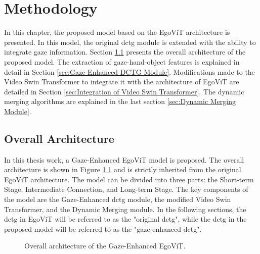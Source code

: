 \chapter{Methodology}
\label{chap:methodology}
In this chapter, the proposed model based on the EgoViT architecture is presented. In this model, the original \gls{dctg} module is extended with the ability to integrate gaze information. Section \ref{sec:Overall Architecture} presents the overall architecture of the proposed model. The extraction of gaze-hand-object features is explained in detail in Section \ref{sec:Gaze-Enhanced DCTG Module}. Modifications made to the Video Swin Transformer \cite{liu_video_2021} to integrate it with the architecture of EgoViT \cite{pan_egovit_2023} are detailed in Section \ref{sec:Integration of Video Swin Transformer}. The dynamic merging algorithms are explained in the last section \ref{sec:Dynamic Merging Module}.

\section{Overall Architecture}
\label{sec:Overall Architecture}
In this thesis work, a Gaze-Enhanced EgoViT model is proposed. The overall architecture is shown in Figure \ref{fig:overall_architecture} and is strictly inherited from the original EgoViT architecture. The model can be divided into three parts: the Short-term Stage, Intermediate Connection, and Long-term Stage. The key components of the model are the Gaze-Enhanced \gls{dctg} module, the modified Video Swin Transformer, and the Dynamic Merging module. In the following sections, the \gls{dctg} in EgoViT will be referred to as the "original \gls{dctg}", while the \gls{dctg} in the proposed model will be referred to as the "gaze-enhanced \gls{dctg}".
\begin{figure}
    \centering
    \caption{Overall architecture of the Gaze-Enhanced EgoViT.}
    \label{fig:overall_architecture}
\end{figure}


